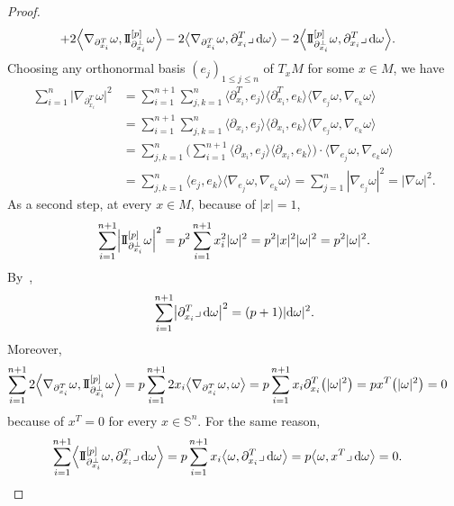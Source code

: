 \documentclass[pdftex]{sigma}
\numberwithin{equation}{section}
\theoremstyle{definition}
\begin{document}
\begin{proof}
\begin{align*}
&{}{+2}\Bigl\langle\nabla_{\partial_{x_i}^T}\omega,\mathrm{I\!I}_{\partial^\perp_{x_i}}^{[p]}\omega\Bigr\rangle-2\bigl\langle \nabla_{\partial_{x_i}^T}\omega,\partial_{x_i}^T\lrcorner\,{\rm d}\omega\bigr\rangle-2\Bigl\langle\mathrm{I\!I}_{\partial^\perp_{x_i}}^{[p]}\omega,\partial_{x_i}^T\lrcorner\,{\rm d}\omega\Bigr\rangle.
\end{align*}
Choosing any or\-tho\-nor\-mal basis $(e_j)_{1\leq j\leq n}$ of $T_x M$ for some $x\in M$, we have
\begin{align*}
\sum_{i=1}^n\bigl|\nabla_{\partial_{x_i}^T}\omega\bigr|^2&=\sum_{i=1}^{n+1}\sum_{j,k=1}^n\bigl\langle\partial^T_{ x_i},e_j\bigr\rangle\bigl\langle\partial^T_{ x_i},e_k\bigr\rangle\langle\nabla_{e_j}\omega,\nabla_{e_k}\omega\rangle\\
&=\sum_{i=1}^{n+1}\sum_{j,k=1}^n\langle\partial_{ x_i},e_j\rangle\langle\partial_{ x_i},e_k\rangle\langle\nabla_{e_j}\omega,\nabla_{e_k}\omega\rangle\\
&=\sum_{j,k=1}^n\Biggl(\sum_{i=1}^{n+1}\langle\partial_{ x_i},e_j\rangle\langle\partial_{ x_i},e_k\rangle\Biggr)\cdot\langle\nabla_{e_j}\omega,\nabla_{e_k}\omega\rangle\\
&=\sum_{j,k=1}^n\langle e_j,e_k\rangle\langle\nabla_{e_j}\omega,\nabla_{e_k}\omega\rangle
=\sum_{j=1}^n|\nabla_{e_j}\omega|^2
=|\nabla\omega|^2.
\end{align*}
As a second step, at every $x\in M$, because of $|x|=1$,
\[\sum_{i=1}^{n+1}\Bigl|\mathrm{I\!I}_{\partial^\perp_{x_i}}^{[p]}\omega\Bigr|^2=p^2\sum_{i=1}^{n+1}x_i^2|\omega|^2=p^2|x|^2|\omega|^2=p^2|\omega|^2.\]
By~\cite[equation~(22)]{EGHM},
\[\sum_{i=1}^{n+1}\bigl|\partial_{x_i}^T\lrcorner\,{\rm d}\omega\bigr|^2=(p+1)|{\rm d}\omega|^2.\]
Moreover,
\begin{align*}
\sum_{i=1}^{n+1}2\Bigl\langle\nabla_{\partial_{x_i}^T}\omega,\mathrm{I\!I}_{\partial^\perp_{x_i}}^{[p]}\omega\Bigr\rangle& =p\sum_{i=1}^{n+1}2x_i\bigl\langle\nabla_{\partial_{x_i}^T}\omega,\omega\bigr\rangle
=p\sum_{i=1}^{n+1}x_i\partial_{x_i}^T\bigl(|\omega|^2\bigr)
=px^T\bigl(|\omega|^2\bigr)
=0
\end{align*}
because of $x^T=0$ for every $x\in\mathbb{S}^n$.
For the same reason,
\begin{align*}
\sum_{i=1}^{n+1}\Bigl\langle\mathrm{I\!I}_{\partial^\perp_{x_i}}^{[p]}\omega,\partial_{x_i}^T\lrcorner\,{\rm d}\omega\Bigr\rangle&=p\sum_{i=1}^{n+1}x_i\bigl\langle\omega,\partial_{x_i}^T\lrcorner\,{\rm d}\omega\bigr\rangle
=p\bigl\langle\omega,x^T\lrcorner\,{\rm d}\omega\bigr\rangle
=0.
\end{align*}

\end{proof}
\end{document}
